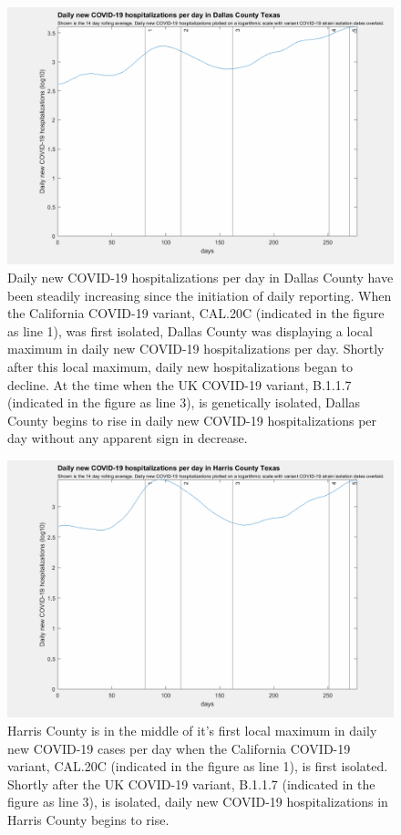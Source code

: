 \documentclass[]{article}
\begin{document}
\begin{figure}[!h]
	\includegraphics[width=\linewidth]{images/dallas_hospitalizations_strains_log.png}
	\caption{Daily new COVID-19 hospitalizations per day in Dallas County have been steadily increasing since the initiation of daily reporting. When the California COVID-19 variant, CAL.20C (indicated in the figure as line 1), was first isolated, Dallas County was displaying a local maximum in daily new COVID-19 hospitalizations per day. Shortly after this local maximum, daily new hospitalizations began to decline. At the time when the UK COVID-19 variant, B.1.1.7 (indicated in the figure as line 3), is genetically isolated, Dallas County begins to rise in daily new COVID-19 hospitalizations per day without any apparent sign in decrease.  }
	\label{fig:images/dallas_hospitalizations_strains_logLabel}
\end{figure}

\begin{figure}[!h]
	\includegraphics[width=\linewidth]{images/harris_hospitalizations_strains_log.png}
	\caption{Harris County is in the middle of it's first local maximum in daily new COVID-19 cases per day when the California COVID-19 variant, CAL.20C (indicated in the figure as line 1), is first isolated. Shortly after the UK COVID-19 variant, B.1.1.7 (indicated in the figure as line 3), is isolated, daily new COVID-19 hospitalizations in Harris County begins to rise.  }
	\label{fig:images/harris_hospitalizations_strains_logLabel}
\end{figure}
\end{document}
